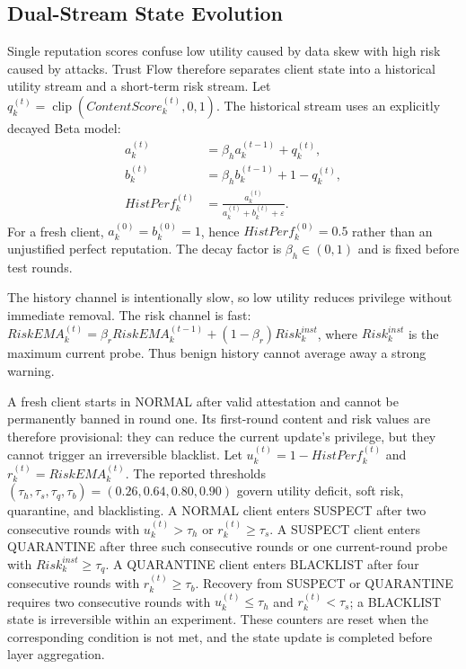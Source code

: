 \documentclass[conference,compsoc]{IEEEtran}
\begin{document}
\subsection{Dual-Stream State Evolution}

Single reputation scores confuse low utility caused by data skew with high risk caused by attacks. Trust Flow therefore separates client state into a historical utility stream and a short-term risk stream. Let $q_k^{(t)}=\operatorname{clip}(ContentScore_k^{(t)},0,1)$. The historical stream uses an explicitly decayed Beta model:
\begin{equation}
\begin{aligned}
    a_k^{(t)}&=\beta_h a_k^{(t-1)}+q_k^{(t)},\\
    b_k^{(t)}&=\beta_h b_k^{(t-1)}+1-q_k^{(t)},\\
    HistPerf_k^{(t)}&=\frac{a_k^{(t)}}{a_k^{(t)}+b_k^{(t)}+\varepsilon}.
\end{aligned}
\end{equation}
For a fresh client, $a_k^{(0)}=b_k^{(0)}=1$, hence $HistPerf_k^{(0)}=0.5$ rather than an unjustified perfect reputation. The decay factor is $\beta_h\in(0,1)$ and is fixed before test rounds.

The history channel is intentionally slow, so low utility reduces privilege without immediate removal. The risk channel is fast: $RiskEMA_k^{(t)}=\beta_rRiskEMA_k^{(t-1)}+(1-\beta_r)Risk_k^{inst}$, where $Risk_k^{inst}$ is the maximum current probe. Thus benign history cannot average away a strong warning.

    A fresh client starts in NORMAL after valid attestation and cannot be permanently banned in round one. Its first-round content and risk values are therefore provisional: they can reduce the current update's privilege, but they cannot trigger an irreversible blacklist. Let $u_k^{(t)}=1-HistPerf_k^{(t)}$ and $r_k^{(t)}=RiskEMA_k^{(t)}$. The reported thresholds $(\tau_h,\tau_s,\tau_q,\tau_b)=(0.26,0.64,0.80,0.90)$ govern utility deficit, soft risk, quarantine, and blacklisting. A NORMAL client enters SUSPECT after two consecutive rounds with $u_k^{(t)}>\tau_h$ or $r_k^{(t)}\geq\tau_s$. A SUSPECT client enters QUARANTINE after three such consecutive rounds or one current-round probe with $Risk_k^{inst}\geq\tau_q$. A QUARANTINE client enters BLACKLIST after four consecutive rounds with $r_k^{(t)}\geq\tau_b$. Recovery from SUSPECT or QUARANTINE requires two consecutive rounds with $u_k^{(t)}\leq\tau_h$ and $r_k^{(t)}<\tau_s$; a BLACKLIST state is irreversible within an experiment. These counters are reset when the corresponding condition is not met, and the state update is completed before layer aggregation.
\end{document}
